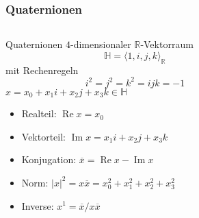 %
%
%
\bgroup
\begin{frame}[t]
\setlength{\abovedisplayskip}{5pt}
\setlength{\belowdisplayskip}{5pt}
\frametitle{Quaternionen}
\vspace{-20pt}
\begin{columns}[t,onlytextwidth]
\begin{column}{0.48\textwidth}
\begin{block}{Quaternionen}
$4$-dimensionaler $\mathbb{R}$-Vektorraum
\[
\mathbb{H}
=
\langle 1,i,j,k\rangle_{\mathbb{R}}
\]
mit Rechenregeln
\[
i^2=j^2=k^2=ijk=-1
\]
$x=x_0+x_1i+x_2j+x_3k\in\mathbb{H}$
\begin{itemize}
\item<2-> Realteil: $\operatorname{Re}x=x_0$
\item<3-> Vektorteil: $\operatorname{Im}x=x_1i+x_2j+x_3k$
\item<4-> Konjugation: $\overline{x}=\operatorname{Re}x-\operatorname{Im}x$
\item<5-> Norm: $|x|^2 = x\overline{x} = x_0^2+x_1^2+x_2^2+x_3^2$
\item<6-> Inverse: $x^{1}= \overline{x}/x\overline{x}$
\end{itemize}
\end{block}
\end{column}
\begin{column}{0.50\textwidth}
\end{column}
\end{columns}
\end{frame}
\egroup
